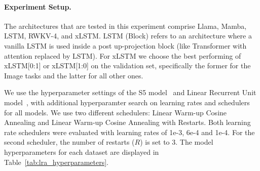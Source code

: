 \documentclass[dvipsnames]{article}
\begin{document}
\begin{appendix}
\paragraph{Experiment Setup.}

The architectures that are tested in this experiment 
comprise Llama, Mamba, LSTM, RWKV-4, and xLSTM. 
LSTM (Block) refers to an architecture where a vanilla LSTM is used 
inside a post up-projection block (like Transformer with attention replaced by LSTM).
For xLSTM we choose the best performing of xLSTM[0:1] or xLSTM[1:0] on the validation set, specifically the former for the Image tasks and the latter for all other ones.

We use the hyperparameter settings of the S5 model~\citep{Smith:22} and 
Linear Recurrent Unit model~\citep{Orvieto:23}, with additional hyperparamter search on learning rates and schedulers for all models. 
We use two different schedulers: Linear Warm-up Cosine Annealing and Linear Warm-up Cosine Annealing with Restarts.
Both learning rate schedulers were evaluated with learning rates of 1e-3, 6e-4 and 1e-4. For the second scheduler, the number of restarts ($R$) is set to 3. 
The model hyperparameters for each dataset are displayed in Table~\ref{tab:lra_hyperparameters}. 




\end{appendix}
\end{document}
